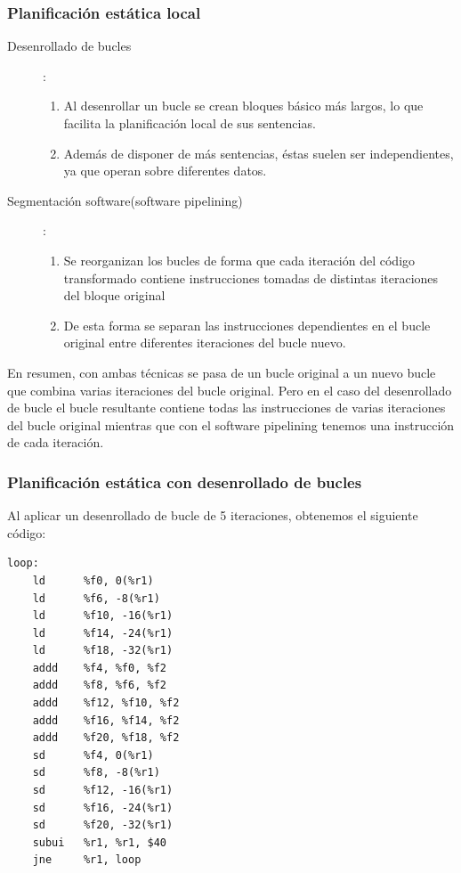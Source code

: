 \documentclass[10pt,a4paper,spanish]{report}
\begin{document}
\textcolor{azul}{\subsubsection{Planificación estática local}}
\begin{description}
    \item[Desenrollado de bucles]:
    \begin{enumerate}[\color{azul}{$\heartsuit$}]
        \item Al desenrollar un bucle se crean bloques básico más largos, lo que facilita la planificación local de sus sentencias.
        \item Además de disponer de más sentencias, éstas suelen ser independientes, ya que operan sobre diferentes datos.
    \end{enumerate}
    \item[Segmentación software(software pipelining)]:
    \begin{enumerate}[\color{azul}{$\heartsuit$}]
        \item Se reorganizan los bucles de forma que cada iteración del código transformado contiene instrucciones tomadas de distintas iteraciones del bloque original
        \item De esta forma se separan las instrucciones dependientes en el bucle original entre diferentes iteraciones del bucle nuevo.
    \end{enumerate}
\end{description}

En resumen, con ambas técnicas se pasa de un bucle original a un nuevo bucle que combina varias iteraciones del bucle original. Pero en el caso del desenrollado de bucle el bucle resultante contiene todas las instrucciones de varias iteraciones del bucle original mientras que con el software pipelining tenemos una instrucción de cada iteración.

\textcolor{azul}{\subsubsection{Planificación estática con desenrollado de bucles}}
Al aplicar un desenrollado de bucle de 5 iteraciones, obtenemos el siguiente código:

\begin{verbatim}
loop:
    ld      %f0, 0(%r1)
    ld      %f6, -8(%r1)
    ld      %f10, -16(%r1)
    ld      %f14, -24(%r1)
    ld      %f18, -32(%r1)
    addd    %f4, %f0, %f2
    addd    %f8, %f6, %f2
    addd    %f12, %f10, %f2
    addd    %f16, %f14, %f2
    addd    %f20, %f18, %f2
    sd      %f4, 0(%r1)
    sd      %f8, -8(%r1)
    sd      %f12, -16(%r1)
    sd      %f16, -24(%r1)
    sd      %f20, -32(%r1)
    subui   %r1, %r1, $40
    jne     %r1, loop
\end{verbatim}
\end{document}

